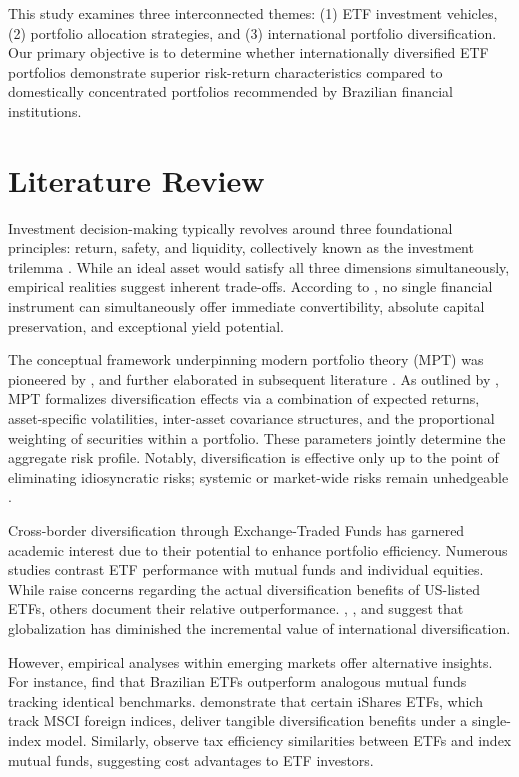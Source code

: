 \documentclass{article}
\begin{document}
This study examines three interconnected themes: (1) ETF investment vehicles, (2) portfolio allocation strategies, and (3) international portfolio diversification. Our primary objective is to determine whether internationally diversified ETF portfolios demonstrate superior risk-return characteristics compared to domestically concentrated portfolios recommended by Brazilian financial institutions.

\section{Literature Review}

Investment decision-making typically revolves around three foundational principles: return, safety, and liquidity, collectively known as the investment trilemma \citep{Pinto_2020}. While an ideal asset would satisfy all three dimensions simultaneously, empirical realities suggest inherent trade-offs. According to \citet{Lima_2021}, no single financial instrument can simultaneously offer immediate convertibility, absolute capital preservation, and exceptional yield potential.

The conceptual framework underpinning modern portfolio theory (MPT) was pioneered by \citet{Markowitz_1952}, and further elaborated in subsequent literature \citep{Fabozzi_Gupta_Markowitz_2002}. As outlined by \citet{Assis_2020}, MPT formalizes diversification effects via a combination of expected returns, asset-specific volatilities, inter-asset covariance structures, and the proportional weighting of securities within a portfolio. These parameters jointly determine the aggregate risk profile. Notably, diversification is effective only up to the point of eliminating idiosyncratic risks; systemic or market-wide risks remain unhedgeable \citep{Elton_2014}.

Cross-border diversification through Exchange-Traded Funds has garnered academic interest due to their potential to enhance portfolio efficiency. Numerous studies contrast ETF performance with mutual funds and individual equities. While \citet{Soydemir_Shin_2010} raise concerns regarding the actual diversification benefits of US-listed ETFs, others document their relative outperformance. \citet{Bekaert_Hodrick_Zhang_2009}, \citet{Chiou_2008}, and \citet{Christoffersen_Errunza_2012} suggest that globalization has diminished the incremental value of international diversification.

However, empirical analyses within emerging markets offer alternative insights. For instance, \citet{Borges_Junior_Yoshinaga_2012} find that Brazilian ETFs outperform analogous mutual funds tracking identical benchmarks. \citet{Pennathur_Delcoure_Anderson_2002} demonstrate that certain iShares ETFs, which track MSCI foreign indices, deliver tangible diversification benefits under a single-index model. Similarly, \citet{Poterba_Shoven_2002} observe tax efficiency similarities between ETFs and index mutual funds, suggesting cost advantages to ETF investors.
\end{document}

